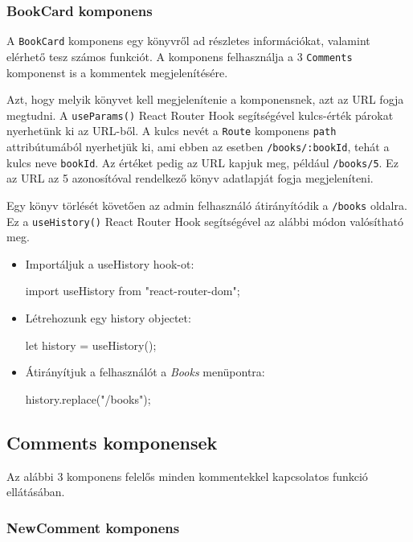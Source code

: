 \subsubsection{BookCard komponens}

A \texttt{BookCard} komponens egy könyvről ad részletes információkat, valamint elérhető tesz számos funkciót. A komponens felhasználja a 3 \texttt{Comments} komponenst is a kommentek megjelenítésére.

Azt, hogy melyik könyvet kell megjelenítenie a komponensnek, azt az URL fogja megtudni. A \texttt{useParams()} React Router Hook segítségével kulcs-érték párokat nyerhetünk ki az URL-ből. A kulcs nevét a \texttt{Route} komponens \texttt{path} attribútumából nyerhetjük ki, ami ebben az esetben \texttt{/books/:bookId}, tehát a kulcs neve \texttt{bookId}. Az értéket pedig az URL kapjuk meg, például \texttt{/books/5}. Ez az URL az 5 azonosítóval rendelkező könyv adatlapját fogja megjeleníteni.

Egy könyv törlését követően az admin felhasználó átirányítódik a \texttt{/books} oldalra. Ez a \texttt{useHistory()} React Router Hook segítségével az alábbi módon valósítható meg.
\begin{itemize}
\item Importáljuk a useHistory hook-ot:
\begin{java}
import { useHistory } from "react-router-dom";
\end{java}
\item Létrehozunk egy history objectet:
\begin{java}
let history = useHistory();
\end{java}
\item Átirányítjuk a felhasználót a \textit{Books} menüpontra:
\begin{java}
history.replace("/books");
\end{java}
\end{itemize}

\subsection{Comments komponensek}

Az alábbi 3 komponens felelős minden kommentekkel kapcsolatos funkció ellátásában.

\subsubsection{NewComment komponens}

